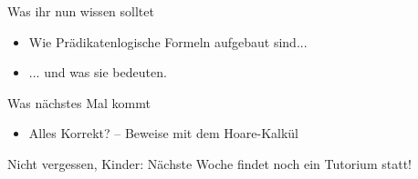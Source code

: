 
\begin{frame}	
	\begin{block}{Was ihr nun wissen solltet}
		\begin{itemize}
			\item Wie Prädikatenlogische Formeln aufgebaut sind...
			\item ... und was sie bedeuten.
		\end{itemize}
	\end{block}
	
	\begin{block}{Was nächstes Mal kommt}
		\begin{itemize}
			\item Alles Korrekt? – Beweise mit dem Hoare-Kalkül
		\end{itemize}
	\end{block}
\end{frame}

\begin{frame}[plain]
	\begin{center}
		\large
		Nicht vergessen, Kinder: Nächste Woche findet noch ein Tutorium statt! \smiley
	\end{center}
\end{frame}

\slideThanks

